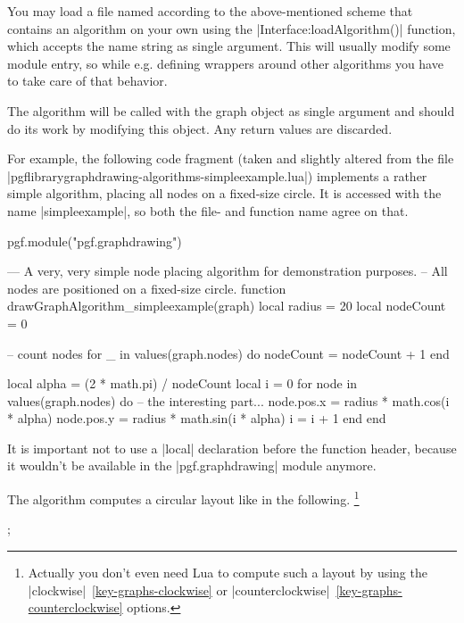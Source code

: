 You may load a file named according to the above-mentioned scheme that
contains an algorithm on your own using the |Interface:loadAlgorithm()|
function, which
accepts the name string as single argument. This will usually modify
some module entry, so while e.g. defining wrappers around other
algorithms you have to take care of that behavior.

The algorithm will be called with the graph object as single argument
and should do its work by modifying this object. Any return
values are discarded.

For example, the following code fragment (taken and slightly altered
from the file\\ |pgflibrarygraphdrawing-algorithms-simpleexample.lua|)
implements a rather simple algorithm, placing all nodes on a fixed-size
circle.  It is accessed with the name |simpleexample|, so both the
file- and function name agree on that.

\begin{codeexample}
pgf.module("pgf.graphdrawing")

--- A very, very simple node placing algorithm for demonstration purposes.
-- All nodes are positioned on a fixed-size circle.
function drawGraphAlgorithm_simpleexample(graph)
   local radius = 20
   local nodeCount = 0

   -- count nodes
   for _ in values(graph.nodes) do
      nodeCount = nodeCount + 1
   end

   local alpha = (2 * math.pi) / nodeCount
   local i = 0
   for node in values(graph.nodes) do
      -- the interesting part...
      node.pos.x = radius * math.cos(i * alpha)
      node.pos.y = radius * math.sin(i * alpha)
      i = i + 1
   end
end
\end{codeexample}

It is important not to use a |local| declaration before the function
header, because it wouldn't be available in the |pgf.graphdrawing|
module anymore.

The algorithm computes a circular layout like in the following.%
\footnote{Actually you don't even need Lua to compute such a layout by
  using the |clockwise|~\ref{key-graphs-clockwise} or
  |counterclockwise|~\ref{key-graphs-counterclockwise} options.}

\begin{codeexample}[]
\tikzpicture [graphs/.cd, graph drawing engine, algorithm=simpleexample]
  ;
\endtikzpicture
\end{codeexample}

